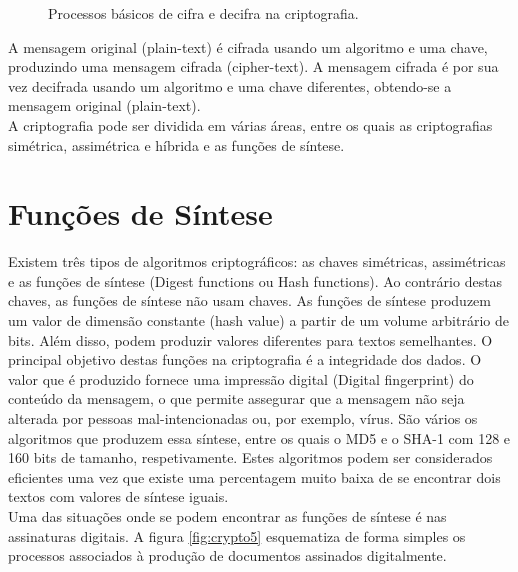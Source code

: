 \documentclass[a4paper,11pt,openright,oneside]{report}
\begin{document}
\begin{figure}[ht]
\center
{}
\caption{Processos básicos de cifra e decifra na criptografia.}
\label{fig:crypto0}
\end{figure}

A mensagem original (plain-text) é cifrada usando um algoritmo e uma chave, produzindo uma mensagem cifrada (cipher-text). A mensagem cifrada é por sua vez decifrada usando um algoritmo e uma chave diferentes, obtendo-se a mensagem original (plain-text).\\

A criptografia pode ser dividida em várias áreas, entre os quais as criptografias simétrica, assimétrica e híbrida e as funções de síntese.

\section{Funções de Síntese}

Existem três tipos de algoritmos criptográficos: as chaves simétricas, assimétricas e as funções de síntese (Digest functions ou Hash functions). Ao contrário destas chaves, as funções de síntese não usam chaves. As funções de síntese produzem um valor de dimensão constante (hash value) a partir de um volume arbitrário de bits. Além disso, podem produzir valores diferentes para textos semelhantes. O principal objetivo destas funções na criptografia é a integridade dos dados. O valor que é produzido fornece uma impressão digital (Digital fingerprint) do conteúdo da mensagem, o que permite assegurar que a mensagem não seja alterada por pessoas mal-intencionadas ou, por exemplo, vírus. São vários os algoritmos que produzem essa síntese, entre os quais o MD5 e o SHA-1 com 128 e 160 bits de tamanho, respetivamente. Estes algoritmos podem ser considerados eficientes uma vez que existe uma percentagem muito baixa de se encontrar dois textos com valores de síntese iguais.\\

Uma das situações onde se podem encontrar as funções de síntese é nas assinaturas digitais. A figura \ref{fig:crypto5} esquematiza de forma simples os processos associados à produção de documentos assinados digitalmente.
\end{document}
